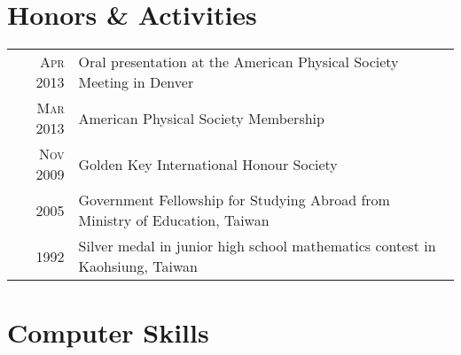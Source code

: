 \documentclass[11pt]{article} %
\begin{document}

\section{Honors \& Activities}

\begin{tabular}{rl}
\textsc{Apr} 2013 & Oral presentation at the American Physical Society Meeting in Denver \\
\textsc{Mar} 2013 & American Physical Society Membership \\
\textsc{Nov} 2009 & Golden Key International Honour Society \\
2005 & Government Fellowship for Studying Abroad from Ministry of Education, Taiwan \\
1992 & Silver medal in junior high school mathematics contest in Kaohsiung, Taiwan \\

\end{tabular}


%
%
%


\section{Computer Skills}
\end{document}

